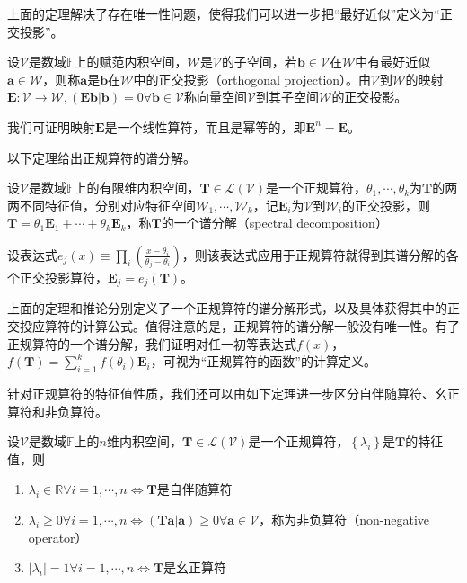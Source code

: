 \documentclass[main.tex]{subfiles}
\begin{document}
上面的定理解决了存在唯一性问题，使得我们可以进一步把“最好近似”定义为“正交投影”。

\begin{definition}[正交投影算符]
设$\mathcal{V}$是数域$\mathbb{F}$上的赋范内积空间，$\mathcal{W}$是$\mathcal{V}$的子空间，若$\mathbf{b}\in\mathcal{V}$在$\mathcal{W}$中有最好近似$\mathbf{a}\in\mathcal{W}$，则称$\mathbf{a}$是$\mathbf{b}$在$\mathcal{W}$中的正交投影（orthogonal projection）。由$\mathcal{V}$到$\mathcal{W}$的映射$\mathbf{E}:\mathcal{V}\rightarrow\mathcal{W},\left(\mathbf{Eb}|\mathbf{b}\right)=0\forall\mathbf{b}\in\mathcal{V}$称向量空间$\mathcal{V}$到其子空间$\mathcal{W}$的正交投影。
\end{definition}

我们可证明映射$\mathbf{E}$是一个线性算符，而且是幂等的，即$\mathbf{E}^n=\mathbf{E}$。

以下定理给出正规算符的谱分解。

\begin{theorem}
设$\mathcal{V}$是数域$\mathbb{F}$上的有限维内积空间，$\mathbf{T}\in\mathcal{L}\left(\mathcal{V}\right)$是一个正规算符，$\theta_1,\cdots,\theta_k$为$\mathbf{T}$的两两不同特征值，分别对应特征空间$\mathcal{W}_1,\cdots,\mathcal{W}_k$，记$\mathbf{E}_i$为$\mathcal{V}$到$\mathcal{W}_i$的正交投影，则$\mathbf{T}=\theta_1\mathbf{E}_1+\cdots+\theta_k\mathbf{E}_k$，称$\mathbf{T}$的一个谱分解（spectral decomposition）
\end{theorem}

\begin{corollary}
设表达式$e_j\left(x\right)\equiv\prod_{i}\left(\frac{x-\theta_i}{\theta_j-\theta_i}\right)$，则该表达式应用于正规算符就得到其谱分解的各个正交投影算符，$\mathbf{E}_j=e_j\left(\mathbf{T}\right)$。
\end{corollary}

上面的定理和推论分别定义了一个正规算符的谱分解形式，以及具体获得其中的正交投应算符的计算公式。值得注意的是，正规算符的谱分解一般没有唯一性。有了正规算符的一个谱分解，我们证明对任一初等表达式$f\left(x\right)$，$f\left(\mathbf{T}\right)=\sum_{i=1}^kf\left(\theta_i\right)\mathbf{E}_i$，可视为“正规算符的函数”的计算定义。

针对正规算符的特征值性质，我们还可以由如下定理进一步区分自伴随算符、幺正算符和非负算符。

\begin{theorem}
设$\mathcal{V}$是数域$\mathbb{F}$上的$n$维内积空间，$\mathbf{T}\in\mathcal{L}\left(\mathcal{V}\right)$是一个正规算符，$\left\{\lambda_i\right\}$是$\mathbf{T}$的特征值，则
\begin{enumerate}
    \item $\lambda_i\in\mathbb{R}\forall i=1,\cdots,n\Leftrightarrow\mathbf{T}$是自伴随算符
    \item $\lambda_i\geq 0\forall i=1,\cdots,n\Leftrightarrow\left(\mathbf{Ta}|\mathbf{a}\right)\geq0\forall\mathbf{a}\in\mathcal{V}$，称为非负算符（non-negative operator）
    \item $\left|\lambda_i\right|=1\forall i=1,\cdots,n\Leftrightarrow\mathbf{T}$是幺正算符
\end{enumerate}
\end{theorem}
\end{document}
